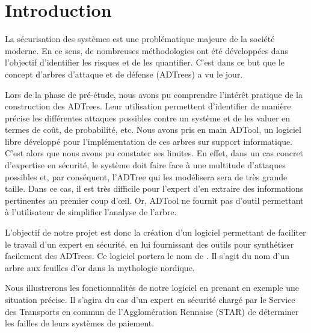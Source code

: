\section{Introduction}
	La sécurisation des systèmes est une problématique majeure de la société moderne. En ce sens, de nombreuses méthodologies ont été développées \cite{introSecurite} dans l'objectif d'identifier les risques et de les quantifier. C'est dans ce but que le concept d'arbres d'attaque et de défense (ADTrees) a vu le jour.

	Lors de la phase de pré-étude, nous avons pu comprendre l’intérêt pratique de la construction des ADTrees. Leur utilisation permettent d'identifier de manière précise les différentes attaques possibles contre un système et de les valuer en termes de coût, de probabilité, etc. Nous avons pris en main ADTool\cite{adtool_paper}, un logiciel libre développé pour l'implémentation de ces arbres sur support informatique. C'est alors que nous avons pu constater ses limites. En effet, dans un cas concret d'expertise en sécurité, le système doit faire face à une multitude d'attaques possibles et, par conséquent, l'ADTree qui les modélisera sera de très grande taille. Dans ce cas, il est très difficile pour l'expert d'en extraire des informations pertinentes au premier coup d’œil. Or, ADTool ne fournit pas d'outil permettant à l'utilisateur de simplifier l'analyse de l'arbre. 

	L'objectif de notre projet est donc la création d'un logiciel permettant de faciliter le travail d'un expert en sécurité, en lui fournissant des outils pour synthétiser facilement des ADTrees. Ce logiciel portera le nom de \glasir. Il s'agit du nom d'un arbre aux feuilles d'or dans la mythologie nordique\cite{vikingCulture}.

	Nous illustrerons les fonctionnalités de notre logiciel en prenant en exemple une situation précise. Il s'agira du cas d'un expert en sécurité chargé par le Service des Transports en commun de l'Agglomération Rennaise (STAR) de déterminer les failles de leurs systèmes de paiement.